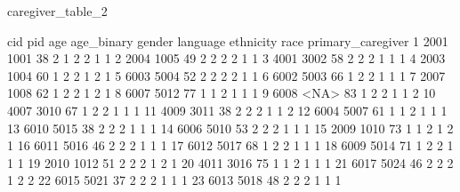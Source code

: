 \documentclass[
  letterpaper,
  DIV=11,
  numbers=noendperiod]{scrreprt}
\newenvironment{Shaded}{\begin{snugshade}}{\end{snugshade}}
\newcommand{\NormalTok}[1]{\textcolor[rgb]{0.00,0.23,0.31}{#1}}
\begin{document}
\begin{Shaded}
\begin{Highlighting}[]
\NormalTok{caregiver\_table\_2}
\end{Highlighting}
\end{Shaded}

\begin{Shaded}
\begin{Highlighting}[]
\NormalTok{     cid  pid age age\_binary gender language ethnicity race primary\_caregiver}
\NormalTok{1   2001 1001  38          2      1        2         2    1                 1}
\NormalTok{2   2004 1005  49          2      2        2         2    1                 1}
\NormalTok{3   4001 3002  58          2      2        2         1    1                 1}
\NormalTok{4   2003 1004  60          1      2        2         1    2                 1}
\NormalTok{5   6003 5004  52          2      2        2         2    1                 1}
\NormalTok{6   6002 5003  66          1      2        2         1    1                 1}
\NormalTok{7   2007 1008  62          1      2        2         1    2                 1}
\NormalTok{8   6007 5012  77          1      1        2         1    1                 1}
\NormalTok{9   6008 \textless{}NA\textgreater{}  83          1      2        2         1    1                 2}
\NormalTok{10  4007 3010  67          1      2        2         1    1                 1}
\NormalTok{11  4009 3011  38          2      2        2         1    1                 2}
\NormalTok{12  6004 5007  61          1      1        2         1    1                 1}
\NormalTok{13  6010 5015  38          2      2        2         1    1                 1}
\NormalTok{14  6006 5010  53          2      2        2         1    1                 1}
\NormalTok{15  2009 1010  73          1      1        2         1    2                 1}
\NormalTok{16  6011 5016  46          2      2        2         1    1                 1}
\NormalTok{17  6012 5017  68          1      2        2         1    1                 1}
\NormalTok{18  6009 5014  71          1      2        2         1    1                 1}
\NormalTok{19  2010 1012  51          2      2        2         1    2                 1}
\NormalTok{20  4011 3016  75          1      1        2         1    1                 1}
\NormalTok{21  6017 5024  46          2      2        2         1    2                 2}
\NormalTok{22  6015 5021  37          2      2        2         1    1                 1}
\NormalTok{23  6013 5018  48          2      2        2         1    1                 1}

\end{Highlighting}
\end{Shaded}
\end{document}
